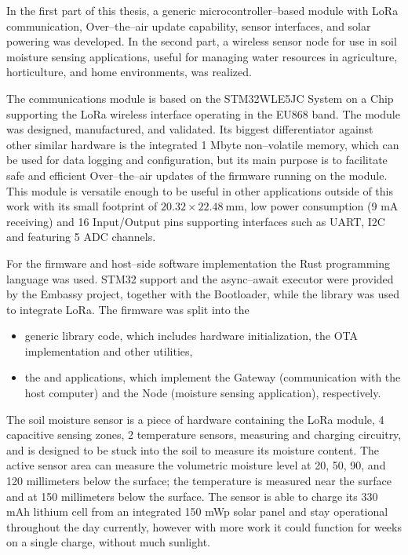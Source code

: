 
In the first part of this thesis, a generic microcontroller--based module with LoRa communication, Over--the--air update capability,  sensor interfaces, and solar powering was developed. In the second part, a wireless sensor node for use in soil moisture sensing applications, useful for managing water resources in agriculture, horticulture, and home environments, was realized.

The communications module is based on the STM32WLE5JC System on a Chip supporting the LoRa wireless interface operating in the EU868 band. The module was designed, manufactured, and validated. Its biggest differentiator against other similar hardware is the integrated 1 Mbyte non--volatile memory, which can be used for data logging and configuration, but its main purpose is to facilitate safe and efficient Over--the--air updates of the firmware running on the module. This module is versatile enough to be useful in other applications outside of this work with its small footprint of $20.32 \times 22.48~\mathrm{mm}$, low power consumption (9 mA receiving) and 16 Input/Output pins supporting interfaces such as UART, I2C and featuring 5 ADC channels.

For the firmware and host--side software implementation the Rust programming language was used. STM32 support and the async--await executor were provided by the Embassy project, together with the Bootloader, while the  library was used to integrate LoRa. The firmware was split into the 
\begin{itemize}
    \item generic  library code, which includes hardware initialization, the OTA implementation and other utilities,
    \item the  and  applications, which implement the Gateway (communication with the host computer) and the Node (moisture sensing application), respectively.
\end{itemize}

The soil moisture sensor is a piece of hardware containing the LoRa module, 4 capacitive sensing zones, 2 temperature sensors, measuring and charging circuitry, and is designed to be stuck into the soil to measure its moisture content. The active sensor area can measure the volumetric moisture level at 20, 50, 90, and 120 millimeters below the surface; the temperature is measured near the surface and at 150 millimeters below the surface. The sensor is able to charge its 330 mAh lithium cell from an integrated 150 mWp solar panel and stay operational throughout the day currently, however with more work it could function for weeks on a single charge, without much sunlight.

